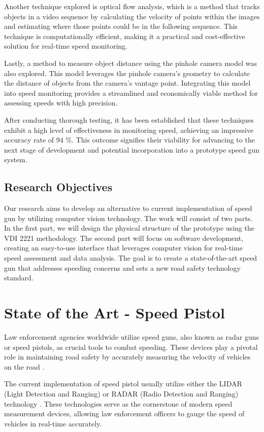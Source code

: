 Another technique explored is optical flow analysis, which is a method that tracks objects in a video sequence by calculating the velocity of points within the images and estimating where those points could be in the following sequence. This technique is computationally efficient, making it a practical and cost-effective solution for real-time speed monitoring.

Lastly, a method to measure object distance using the pinhole camera model was also explored. This model leverages the pinhole camera's geometry to calculate the distance of objects from the camera's vantage point. Integrating this model into speed monitoring provides a streamlined and economically viable method for assessing speeds with high precision.

After conducting thorough testing, it has been established that these techniques exhibit a high level of effectiveness in monitoring speed, achieving an impressive accuracy rate of 94 \%. This outcome signifies their viability for advancing to the next stage of development and potential incorporation into a prototype speed gun system.

\section{Research Objectives}
Our research aims to develop an alternative to current implementation of speed gun by utilizing computer vision technology. The work will consist of two parts. In the first part, we will design the physical structure of the prototype using the VDI 2221 methodology. The second part will focus on software development, creating an easy-to-use interface that leverages computer vision for real-time speed assessment and data analysis. The goal is to create a state-of-the-art speed gun that addresses speeding concerns and sets a new road safety technology standard.

\chapter{State of the Art - Speed Pistol}
\label{chap:stateoftheart}
Law enforcement agencies worldwide utilize speed guns, also known as radar guns or speed pistols, as crucial tools to combat speeding. These devices play a pivotal role in maintaining road safety by accurately measuring the velocity of vehicles on the road \cite{Hull_2020}.

The current implementation of speed pistol usually utilize either the LIDAR (Light Detection and Ranging) or RADAR (Radio Detection and Ranging) technology \cite{StalkerRadar_2023} \cite{FlyGuys_2023} \cite{Kustom23} \cite{LaserTech_2023}. These technologies serve as the cornerstone of modern speed measurement devices, allowing law enforcement officers to gauge the speed of vehicles in real-time accurately.

